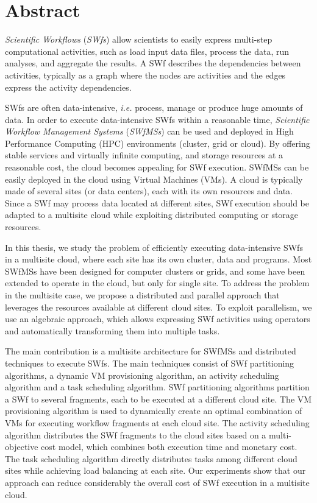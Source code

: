 \chapter{Abstract}

\textit{Scientific Workflows} (\textit{SWfs}) allow scientists to easily express multi-step computational
activities, such as load input data files, process the data, run analyses, and aggregate
the results. A SWf describes the dependencies between activities, typically as a graph
where the nodes are activities and the edges express the activity dependencies.

SWfs are often data-intensive, \textit{i.e.} process, manage or produce huge amounts of data.
In order to execute data-intensive SWfs within a reasonable time, \textit{Scientific Workflow Management Systems} (\textit{SWfMSs})
can be used and deployed in High Performance Computing (HPC) environments (cluster, grid
or cloud).
By offering stable services and virtually infinite computing,
and storage resources at a reasonable cost, the cloud becomes appealing for SWf execution. SWfMSs
can be easily deployed in the cloud using Virtual Machines (VMs). A cloud is
typically made of several sites (or data centers), each with its own resources and data.
Since a SWf may process data located at different sites, SWf execution should be
adapted to a multisite cloud while exploiting distributed computing or storage resources.

In this thesis, we study the problem of efficiently executing data-intensive SWfs in
a multisite cloud, where each site has its own cluster, data and programs.
Most SWfMSs have been designed for computer clusters or grids, and some have been extended
to operate in the cloud, but only for single site.
To address the problem in the multisite case, we propose a distributed and parallel
approach that leverages the resources available at different cloud sites.
To exploit parallelism, we use an algebraic approach, which allows expressing SWf activities
using operators and automatically transforming them into multiple tasks.

The main contribution is a multisite architecture for SWfMSs and distributed techniques to
execute SWfs.
The main techniques consist of SWf partitioning algorithms, a dynamic VM provisioning algorithm, an
activity scheduling algorithm and a task scheduling algorithm. 
SWf partitioning algorithms partition a SWf to several fragments, each
to be executed at a different cloud site.
The VM provisioning algorithm is used to dynamically create an optimal combination of VMs
for executing workflow fragments at each cloud site.
The activity scheduling algorithm distributes the SWf fragments to the
cloud sites based on a multi-objective
cost model, which combines both  execution time and monetary cost.
The task scheduling algorithm directly distributes tasks among different cloud sites while
achieving load balancing at each site. 
Our experiments show that our approach can reduce considerably
the overall cost of SWf execution in a multisite cloud.




